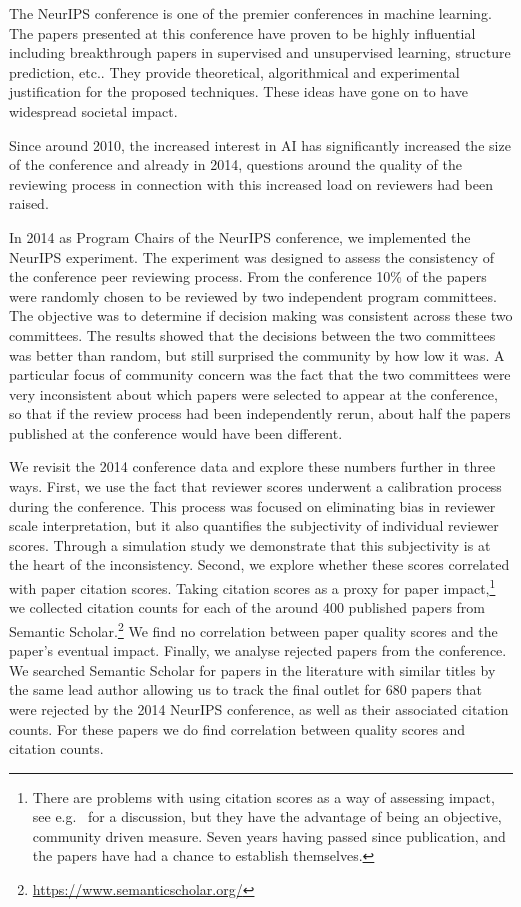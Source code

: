 \documentclass[twoside]{article}
\begin{document}
The NeurIPS conference is one of the premier conferences in machine
learning.  The papers presented at this conference have
proven to be highly influential including breakthrough papers in
supervised and unsupervised learning, structure prediction, etc.. They provide theoretical, algorithmical and experimental justification
for the proposed techniques. These ideas have gone on to have widespread
societal impact.

Since around 2010, the increased interest in AI has
significantly increased the size of the conference and already in
2014, questions around the quality of the reviewing process in
connection with this increased load on reviewers had been raised.

In 2014 as Program Chairs of the NeurIPS conference, we implemented the NeurIPS experiment. The experiment
was designed to assess the consistency of the conference peer
reviewing process. From the conference 10\% of the papers were
randomly chosen to be reviewed by two independent program
committees. The objective was to determine if decision making was
consistent across these two committees.  The results showed that the
decisions between the two committees was better than random, but still
surprised the community by how low it was.  A particular focus of community concern was
the fact that the two committees were 
very inconsistent about which papers were selected to appear at the
conference, so that if the review process had been independently
rerun, about half the papers published at the conference would have
been different.

We revisit the 2014 conference data and explore these numbers further
in three ways. First, we use the fact that reviewer scores underwent a
calibration process during the conference. This process was focused on
eliminating bias in reviewer scale interpretation, but it also
quantifies the subjectivity of individual reviewer scores. Through a
simulation study we demonstrate that this subjectivity is at the
heart of the inconsistency. Second, we explore whether these scores
correlated with paper citation scores.  Taking citation scores as a
proxy for paper impact,\footnote{There are problems with using
  citation scores as a way of assessing impact, see
  e.g.\ \cite{Neylon-article09} for a discussion, but they have the
  advantage of being an objective, community driven measure. Seven
  years having passed since publication, and the papers have had a
  chance to establish themselves.} we collected citation counts for
each of the around 400 published papers from Semantic
Scholar.\footnote{\url{https://www.semanticscholar.org/}} We find no
correlation between paper quality scores and the paper's eventual
impact. Finally, we analyse rejected papers from the conference. We
searched Semantic Scholar for papers in the literature with similar titles by the same
lead author allowing us to track the final outlet
for 680 papers that were rejected by the 2014 NeurIPS conference, as
well as their associated citation counts. For these papers we do find
correlation between quality scores and citation counts.
\end{document}
